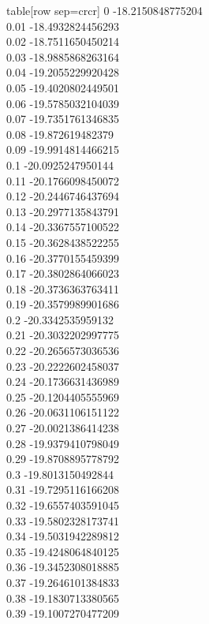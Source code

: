   table[row sep=crcr]{%
0	-18.2150848775204\\
0.01	-18.4932824456293\\
0.02	-18.7511650450214\\
0.03	-18.9885868263164\\
0.04	-19.2055229920428\\
0.05	-19.4020802449501\\
0.06	-19.5785032104039\\
0.07	-19.7351761346835\\
0.08	-19.872619482379\\
0.09	-19.9914814466215\\
0.1	-20.0925247950144\\
0.11	-20.1766098450072\\
0.12	-20.2446746437694\\
0.13	-20.2977135843791\\
0.14	-20.3367557100522\\
0.15	-20.3628438522255\\
0.16	-20.3770155459399\\
0.17	-20.3802864066023\\
0.18	-20.3736363763411\\
0.19	-20.3579989901686\\
0.2	-20.3342535959132\\
0.21	-20.3032202997775\\
0.22	-20.2656573036536\\
0.23	-20.2222602458037\\
0.24	-20.1736631436989\\
0.25	-20.1204405555969\\
0.26	-20.0631106151122\\
0.27	-20.0021386414238\\
0.28	-19.9379410798049\\
0.29	-19.8708895778792\\
0.3	-19.8013150492844\\
0.31	-19.7295116166208\\
0.32	-19.6557403591045\\
0.33	-19.5802328173741\\
0.34	-19.5031942289812\\
0.35	-19.4248064840125\\
0.36	-19.3452308018885\\
0.37	-19.2646101384833\\
0.38	-19.1830713380565\\
0.39	-19.1007270477209\\
}
